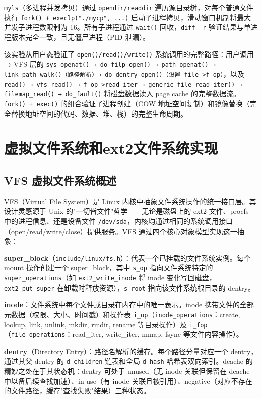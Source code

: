 \documentclass[a4paper]{article}
\begin{document}
\texttt{myls}（多进程并发拷贝）通过 \texttt{opendir/readdir} 遍历源目录树，对每个普通文件执行 \texttt{fork() + execlp("./mycp", ...)} 启动子进程拷贝，滑动窗口机制将最大并发子进程数限制为 16。所有子进程通过 \texttt{wait()} 回收，\texttt{diff -r} 验证结果与单进程版本完全一致，且无僵尸进程（PID 泄漏）。

该实验从用户态验证了 \texttt{open()/read()/write()} 系统调用的完整路径：用户调用 → VFS 层的 \texttt{sys\_openat() → do\_filp\_open() → path\_openat() → link\_path\_walk()（路径解析）→ do\_dentry\_open()（设置 file->f\_op）}，以及 \texttt{read() → vfs\_read() → f\_op->read\_iter → generic\_file\_read\_iter() → filemap\_read() → do\_fault()} 将磁盘数据读入 page cache 的完整数据流。\texttt{fork() + exec()} 的组合验证了进程创建（COW 地址空间复制）和镜像替换（完全替换地址空间的代码、数据、堆、栈）的完整生命周期。

\section{虚拟文件系统和ext2文件系统实现} \label{sec:ch6}

\subsection{VFS 虚拟文件系统概述}

VFS（Virtual File System）是 Linux 内核中抽象文件系统操作的统一接口层\cite{vfs_doc,maurice}。其设计灵感源于 Unix 的"一切皆文件"哲学——无论是磁盘上的 ext2 文件、procfs 中的进程信息、还是设备文件 \texttt{/dev/sda}，内核均通过相同的系统调用接口（open/read/write/close）提供服务。VFS 通过四个核心对象模型实现这一抽象：

\textbf{super\_block}（\texttt{include/linux/fs.h}）：代表一个已挂载的文件系统实例。每个 mount 操作创建一个 super\_block，其中 \texttt{s\_op} 指向文件系统特定的 \texttt{super\_operations}（如 \texttt{ext2\_write\_inode} 将 inode 变化写回磁盘，\texttt{ext2\_put\_super} 在卸载时释放资源），\texttt{s\_root} 指向该文件系统根目录的 dentry。

\textbf{inode}：文件系统中每个文件或目录在内存中的唯一表示。inode 携带文件的全部元数据（权限、大小、时间戳）和操作表 \texttt{i\_op}（\texttt{inode\_operations}：create, lookup, link, unlink, mkdir, rmdir, rename 等目录操作）及 \texttt{i\_fop}（\texttt{file\_operations}：read\_iter, write\_iter, mmap, fsync 等文件内容操作）。

\textbf{dentry}（Directory Entry）：路径名解析的缓存。每个路径分量对应一个 dentry，通过其父 dentry 的 \texttt{d\_children} 链表和全局 \texttt{d\_hash} 哈希表双向索引。dcache 的精妙之处在于其状态机：dentry 可处于 unused（无 inode 关联但保留在 dcache 中以备后续查找加速）、in-use（有 inode 关联且被引用）、negative（对应不存在的文件路径，缓存"查找失败"结果）三种状态。
\end{document}
